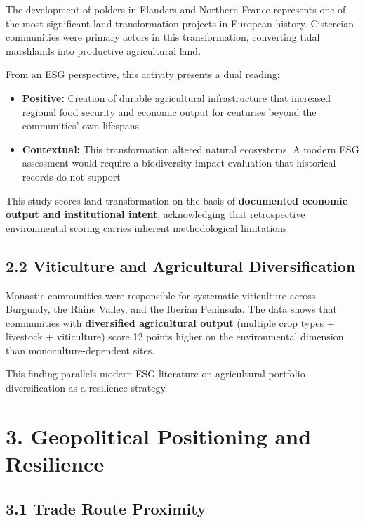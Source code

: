 \documentclass[
  11pt,
  a4paper,
]{article}
\providecommand{\tightlist}{%
  \setlength{\itemsep}{0pt}\setlength{\parskip}{0pt}}\usepackage{longtable,booktabs,array}
\begin{document}
The development of polders in Flanders and Northern France represents
one of the most significant land transformation projects in European
history. Cistercian communities were primary actors in this
transformation, converting tidal marshlands into productive agricultural
land.

From an ESG perspective, this activity presents a dual reading:

\begin{itemize}
\tightlist
\item
  \textbf{Positive:} Creation of durable agricultural infrastructure
  that increased regional food security and economic output for
  centuries beyond the communities' own lifespans
\item
  \textbf{Contextual:} This transformation altered natural ecosystems. A
  modern ESG assessment would require a biodiversity impact evaluation
  that historical records do not support
\end{itemize}

This study scores land transformation on the basis of \textbf{documented
economic output and institutional intent}, acknowledging that
retrospective environmental scoring carries inherent methodological
limitations.

\subsection{2.2 Viticulture and Agricultural
Diversification}\label{viticulture-and-agricultural-diversification}

Monastic communities were responsible for systematic viticulture across
Burgundy, the Rhine Valley, and the Iberian Peninsula. The data shows
that communities with \textbf{diversified agricultural output} (multiple
crop types + livestock + viticulture) score 12 points higher on the
environmental dimension than monoculture-dependent sites.

This finding parallels modern ESG literature on agricultural portfolio
diversification as a resilience strategy.

\section{3. Geopolitical Positioning and
Resilience}\label{geopolitical-positioning-and-resilience}

\subsection{3.1 Trade Route Proximity}\label{trade-route-proximity}
\end{document}

